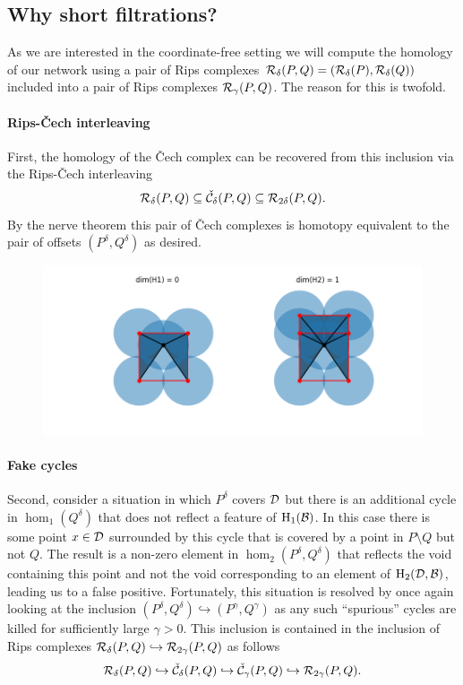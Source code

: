 \subsection{Why short filtrations?}

As we are interested in the coordinate-free setting we will compute the homology of our network using a pair of Rips complexes $\mathcal{R}_\delta(P, Q) = (\mathcal{R}_\delta(P),\mathcal{R}_\delta(Q))$ included into a pair of Rips complexes $\mathcal{R}_\gamma(P, Q)$.
The reason for this is twofold.

\paragraph{Rips-\v Cech interleaving}

First, the homology of the \v Cech complex can be recovered from this inclusion via the Rips-\v Cech interleaving
\[ \mathcal{R}_\delta(P, Q) \subseteq \check{\mathcal{C}}_\delta(P, Q)\subseteq \mathcal{R}_{2\delta}(P,Q).\]
By the nerve theorem this pair of \v Cech complexes is homotopy equivalent to the pair of offsets $(P^\delta, Q^\delta)$ as desired.


\begin{figure}[htbp]
\centering
    \includegraphics[scale=0.7]{figures/counter.png}
\end{figure}

\paragraph{Fake cycles}
Second, consider a situation in which $P^\delta$ covers ${\mathcal{D}}$ but there is an additional cycle in $\hom_1(Q^\delta)$ that does not reflect a feature of $\mathrm{H}_1({\mathcal{B}})$.
In this case there is some point $x\in{\mathcal{D}}$ surrounded by this cycle that is covered by a point in $P\setminus Q$ but not $Q$.
The result is a non-zero element in $\hom_2(P^\delta, Q^\delta)$ that reflects the void containing this point and not the void corresponding to an element of $\mathrm{H}_2({\mathcal{D}},{\mathcal{B}})$, leading us to a false positive.
Fortunately, this situation is resolved by once again looking at the inclusion $(P^\delta, Q^\delta)\hookrightarrow (P^\gamma, Q^\gamma)$ as any such ``spurious'' cycles are killed for sufficiently large $\gamma > 0$.
This inclusion is contained in the inclusion of Rips complexes $\mathcal{R}_\delta(P, Q)\hookrightarrow\mathcal{R}_{2\gamma}(P, Q)$ as follows
\[ \mathcal{R}_\delta(P, Q) \hookrightarrow \check{\mathcal{C}}_\delta(P,Q)\hookrightarrow\check{\mathcal{C}}_\gamma(P,Q)\hookrightarrow\mathcal{R}_{2\gamma}(P, Q). \]

